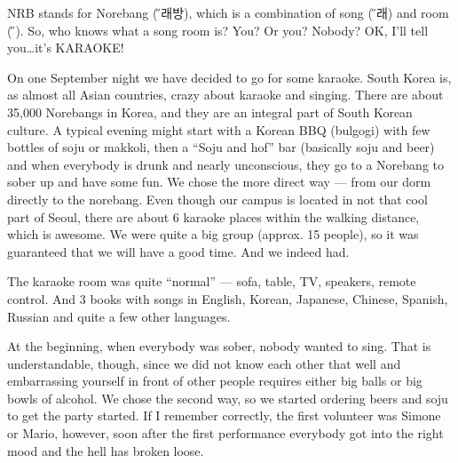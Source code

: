 \begin{post}
	\begin{content}
NRB stands for Norebang ({\H 노래방}), which is a combination of song ({\H 노래}) and room ({\H 방}). So, who knows what a song room is? You? Or you? Nobody? OK, I'll tell you{\ldots}it's KARAOKE!

\begin{figure}
\vspace{-12pt}\centering{}
\vspace{-24pt}
\end{figure}On one September night we have decided to go for some karaoke. South Korea is, as almost all Asian countries, crazy about karaoke and singing. There are about 35,000 Norebangs in Korea, and they are an integral part of South Korean culture. A typical evening might start with a Korean BBQ (bulgogi) with few bottles of soju or makkoli, then a ``Soju and hof'' bar (basically soju and beer) and when everybody is drunk and nearly unconscious, they go to a Norebang to sober up and have some fun. We chose the more direct way --- from our dorm directly to the norebang. Even though our campus is located in not that cool part of Seoul, there are about 6 karaoke places within the walking distance, which is awesome. We were quite a big group (approx. 15 people), so it was guaranteed that we will have a good time. And we indeed had.

The karaoke room was quite ``normal'' --- sofa, table, TV, speakers, remote control. And 3 books with songs in English, Korean, Japanese, Chinese, Spanish, Russian and quite a few other languages.

At the beginning, when everybody was sober, nobody wanted to sing. That is understandable, though, since we did not know each other that well and embarrassing yourself in front of other people requires either big balls or big bowls of alcohol. We chose the second way, so we started ordering beers and soju to get the party started. If I remember correctly, the first volunteer was Simone or Mario, however, soon after the first performance everybody got into the right mood and the hell has broken loose.


\end{content}
\end{post}

